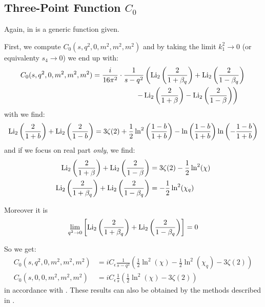 \subsection[Three-Point Function C0]{Three-Point Function $C_0$}
Again, in \cite[eq. (4.26)]{Denner:2005nn} is a generic function given.

First, we compute $C_0(s,q^2,0,m^2,m^2,m^2)$ and by taking the limit $k_1^2\rightarrow 0$ (or equivalenty $s_4\rightarrow 0$) we end up with:
\begin{align}
C_0(s,q^2,0,m^2,m^2,m^2)&=\frac{i}{16\pi^2}\cdot\frac 1{s-q^2}\left(\operatorname{\text{Li}_2}\left(\frac 2 {1+\beta_q}\right)+\operatorname{\text{Li}_2}\left(\frac 2 {1-\beta_q}\right)\right.\nonumber\\
&\hspace{60pt}\left.-\operatorname{\text{Li}_2}\left(\frac 2 {1+\beta}\right)-\operatorname{\text{Li}_2}\left(\frac 2 {1-\beta}\right)\right)
\end{align}
with \cite{Zagier2007} we find:
\begin{equation}
\operatorname{\text{Li}_2}\left(\frac 2 {1+b}\right)+\operatorname{\text{Li}_2}\left(\frac 2 {1-b}\right) =3\zeta(2)+\frac 1 2\ln^2\left(\frac{1-b}{1+b}\right)-\ln\left(\frac{1-b}{1+b}\right)\ln\left(-\frac{1-b}{1+b}\right)
\end{equation}
and if we focus on real part \textit{only}, we find:
\begin{align}
\operatorname{\text{Li}_2}\left(\frac 2 {1+\beta}\right)+\operatorname{\text{Li}_2}\left(\frac 2 {1-\beta}\right) &=3\zeta(2)-\frac 1 2\ln^2(\chi)\\
\operatorname{\text{Li}_2}\left(\frac 2 {1+\beta_q}\right)+\operatorname{\text{Li}_2}\left(\frac 2 {1-\beta_q}\right) &=-\frac 1 2\ln^2(\chi_q)
\end{align}

Moreover it is
\begin{equation}
\lim_{q^2\rightarrow 0}\left[\operatorname{\text{Li}_2}\left(\frac 2 {1+\beta_q}\right)+\operatorname{\text{Li}_2}\left(\frac 2 {1-\beta_q}\right)\right] = 0
\end{equation}

So we get:
\begin{align}
C_0(s,q^2,0,m^2,m^2,m^2)&=iC_\epsilon\frac 1{s-q^2}\left(\frac 1 2\ln^2(\chi)-\frac 1 2\ln^2(\chi_q)-3\zeta(2)\right)\\
C_0(s,0,0,m^2,m^2,m^2)&=iC_\epsilon\frac 1{s}\left(\frac 1 2\ln^2(\chi)-3\zeta(2)\right)
\end{align}
in accordance with \cite{Bojak:2000eu}\cite{PhysRevD.40.54}\cite{Laenen1993162}. These results can also be obtained by the methods described in \cite[chap. 3]{Bojak:2000eu}.

